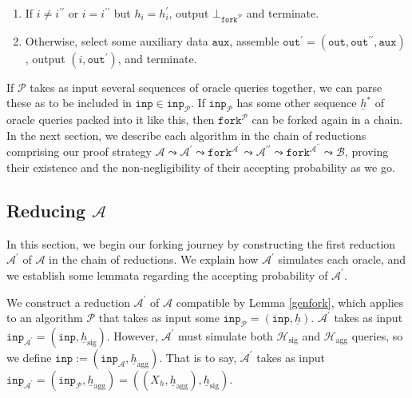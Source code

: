\documentclass{mrl}
\theoremstyle{definition}
\numberwithin{theorem}{subsection}
\newcommand{\adversary}{\mathcal{A}}
\newcommand{\reduxChain}{\adversary \leadsto \adversary^\prime \leadsto \texttt{fork}^{\adversary^\prime}  \leadsto \adversary^{\prime \prime} \leadsto \texttt{fork}^{\adversary^{\prime \prime}} \leadsto \mathcal{B}}
\begin{document}
\begin{description}
\begin{enumerate}
\item If $i \neq i^{\prime \prime}$ or $i = i^{\prime \prime}$ but $h_{i} = h^{\prime}_{i}$, output $\bot_{\texttt{fork}^{\mathcal{P}}}$ and terminate.

\item Otherwise, select some auxiliary data $\texttt{aux}$, assemble $\texttt{out}^\prime = (\texttt{out}, \texttt{out}^{\prime\prime}, \texttt{aux})$, output $(i, \texttt{out}^\prime)$, and terminate. 
\end{enumerate}

\end{description} %
If $\mathcal{P}$ takes as input several sequences of oracle queries together, we can parse these as to be included in $\texttt{inp} \in \texttt{inp}_{\mathcal{P}}$. If $\texttt{inp}_{\mathcal{P}}$ has some other sequence $\underline{h}^*$ of oracle queries packed into it like this,  then $\texttt{fork}^{\mathcal{P}}$ can be forked again in a chain. In the next section, we describe each algorithm in the chain  of reductions comprising our proof strategy $\reduxChain$, proving their existence and the non-negligibility of their accepting probability as we go.

\subsection{Reducing $\mathcal{A}$}\label{reducingA}

In this section, we begin our forking journey by constructing the first reduction $\adversary^\prime$ of $\adversary$ in the chain of reductions. We explain how $\adversary^\prime$ simulates each oracle, and we establish some lemmata regarding the accepting probability of $\adversary^\prime$.

We construct a reduction $\adversary^\prime$ of $\adversary$ compatible by Lemma \ref{genfork}, which applies to an algorithm $\mathcal{P}$ that takes as input some $\texttt{inp}_\mathcal{P} = (\texttt{inp}, \underline{h})$.  $\adversary^\prime$ takes as input $\texttt{inp}_{\adversary^\prime} = (\texttt{inp}, \underline{h}_{\text{sig}})$. However, $\adversary^\prime$ must simulate both $\mathcal{H}_{\text{sig}}$ and $\mathcal{H}_{\text{agg}}$ queries, so we define $\texttt{inp} := (\texttt{inp}_{\adversary}, \underline{h}_{\text{agg}})$. That is to say, $\adversary^\prime$ takes as input $\texttt{inp}_{\adversary^\prime} = (\texttt{inp}_\mathcal{P}, \underline{h}_{\text{agg}}) = \left((X_h, \underline{h}_{\text{agg}}), \underline{h}_{\text{sig}}\right)$. 
\end{document}
